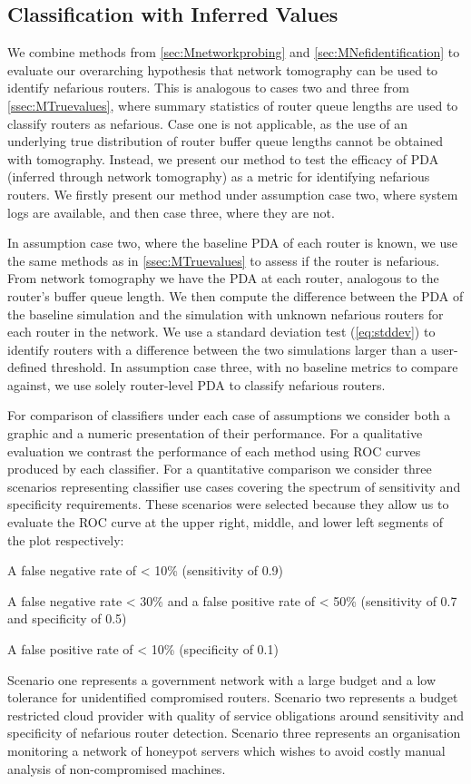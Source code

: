 \subsection{Classification with Inferred Values}
\label{ssec:MInferredvalues}
We combine methods from \cref{sec:Mnetworkprobing} and \cref{sec:MNefidentification} to evaluate our overarching hypothesis that network tomography can be used to identify nefarious routers. This is analogous to cases two and three from \cref{ssec:MTruevalues}, where summary statistics of router queue lengths are used to classify routers as nefarious. Case one is not applicable, as the use of an underlying true distribution of router buffer queue lengths cannot be obtained with tomography. Instead, we present our method to test the efficacy of PDA (inferred through network tomography) as a metric for identifying nefarious routers. We firstly present our method under assumption case two, where system logs are available, and then case three, where they are not.\par
In assumption case two, where the baseline PDA of each router is known, we use the same methods as in \cref{ssec:MTruevalues} to assess if the router is nefarious. From network tomography we have the PDA at each router, analogous to the router's buffer queue length. We then compute the difference between the PDA of the baseline simulation and the simulation with unknown nefarious routers for each router in the network. We use a standard deviation test (\cref{eq:stddev}) to identify routers with a difference between the two simulations larger than a user-defined threshold. In assumption case three, with no baseline metrics to compare against, we use solely router-level PDA to classify nefarious routers.\par
For comparison of classifiers under each case of assumptions we consider both a graphic and a numeric presentation of their performance. For a qualitative evaluation we contrast the performance of each method using ROC curves produced by each classifier. For a quantitative comparison we consider three scenarios representing classifier use cases covering the spectrum of sensitivity and specificity requirements. These scenarios were selected because they allow us to evaluate the ROC curve at the upper right, middle, and lower left segments of the plot respectively: 
\begin{description}[labelindent=1cm]
  \item[Scenario 1:] A false negative rate of < 10\% (sensitivity of 0.9)
  \item[Scenario 2:] A false negative rate < 30\%  and a false positive rate of < 50\% (sensitivity of 0.7 and specificity of 0.5)
  \item[Scenario 3:] A false positive rate of < 10\% (specificity of 0.1)
\end{description}
Scenario one represents a government network with a large budget and a low tolerance for unidentified compromised routers. Scenario two represents a budget restricted cloud provider with quality of service obligations around sensitivity and specificity of nefarious router detection. Scenario three represents an organisation monitoring a network of honeypot servers which wishes to avoid costly manual analysis of non-compromised machines.

